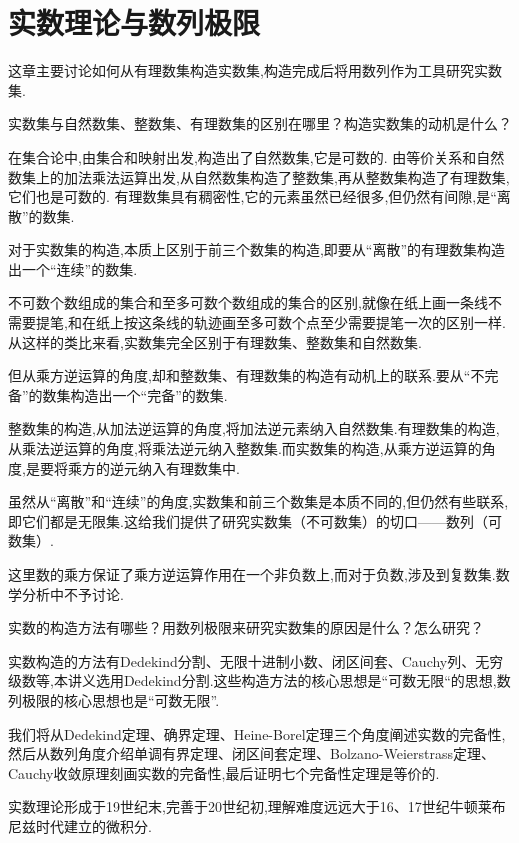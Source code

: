 \chapter{实数理论与数列极限}

这章主要讨论如何从有理数集构造实数集,构造完成后将用数列作为工具研究实数集.

\begin{note}实数集与自然数集、整数集、有理数集的区别在哪里？构造实数集的动机是什么？

在集合论中,由集合和映射出发,构造出了自然数集,它是可数的.
由等价关系和自然数集上的加法乘法运算出发,从自然数集构造了整数集,再从整数集构造了有理数集,它们也是可数的.
有理数集具有稠密性,它的元素虽然已经很多,但仍然有间隙,是“离散”的数集.

对于实数集的构造,本质上区别于前三个数集的构造,即要从“离散”的有理数集构造出一个“连续”的数集.

不可数个数组成的集合和至多可数个数组成的集合的区别,就像在纸上画一条线不需要提笔,和在纸上按这条线的轨迹画至多可数个点至少需要提笔一次的区别一样.从这样的类比来看,实数集完全区别于有理数集、整数集和自然数集.

但从乘方逆运算的角度,却和整数集、有理数集的构造有动机上的联系.要从“不完备”的数集构造出一个“完备”的数集.

整数集的构造,从加法逆运算的角度,将加法逆元素纳入自然数集.有理数集的构造,从乘法逆运算的角度,将乘法逆元纳入整数集.而实数集的构造,从乘方逆运算的角度,是要将乘方的逆元纳入有理数集中.
\end{note}

\begin{remark}
    虽然从“离散”和“连续”的角度,实数集和前三个数集是本质不同的,但仍然有些联系,即它们都是无限集.这给我们提供了研究实数集（不可数集）的切口——数列（可数集）.
\end{remark}

\begin{remark}
    这里数的乘方保证了乘方逆运算作用在一个非负数上,而对于负数,涉及到复数集.数学分析中不予讨论.%
\end{remark}

\begin{note}实数的构造方法有哪些？用数列极限来研究实数集的原因是什么？怎么研究？

    实数构造的方法有Dedekind分割、无限十进制小数、闭区间套、Cauchy列、无穷级数等,本讲义选用Dedekind分割.这些构造方法的核心思想是“可数无限“的思想,数列极限的核心思想也是“可数无限”.

    我们将从Dedekind定理、确界定理、Heine-Borel定理三个角度阐述实数的完备性,然后从数列角度介绍单调有界定理、闭区间套定理、Bolzano-Weierstrass定理、Cauchy收敛原理刻画实数的完备性,最后证明七个完备性定理是等价的.
    
\end{note}

\begin{remark}
    实数理论形成于19世纪末,完善于20世纪初,理解难度远远大于16、17世纪牛顿莱布尼兹时代建立的微积分.
\end{remark}



